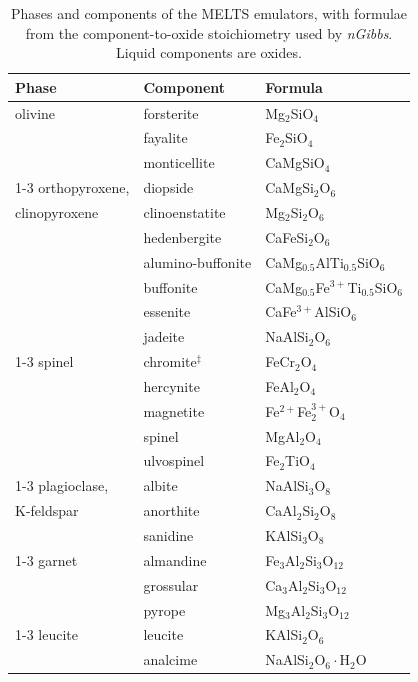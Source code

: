 \begin{landscape}
\begin{table}[p]
\centering
\scriptsize
\setlength{\tabcolsep}{4pt}
\setlength{\aboverulesep}{0.2ex}
\setlength{\belowrulesep}{0.3ex}
\caption{Phases and components of the \textsc{MELTS} emulators, with formulae from the component-to-oxide stoichiometry used by \emph{nGibbs}. 
Liquid components are oxides.}\label{tab:ch4-components-melts}
\noindent
\begin{tabular}[t]{@{}l l l@{}}
\toprule
Phase & Component & Formula \\
\midrule
olivine & forsterite & Mg$_{2}$SiO$_{4}$ \\
 & fayalite & Fe$_{2}$SiO$_{4}$ \\
 & monticellite & CaMgSiO$_{4}$ \\
\cmidrule{1-3}
orthopyroxene, & diopside & CaMgSi$_{2}$O$_{6}$ \\
clinopyroxene & clinoenstatite & Mg$_{2}$Si$_{2}$O$_{6}$ \\
 & hedenbergite & CaFeSi$_{2}$O$_{6}$ \\
 & alumino-buffonite & CaMg$_{0.5}$AlTi$_{0.5}$SiO$_{6}$ \\
 & buffonite & CaMg$_{0.5}$Fe$^{3+}$Ti$_{0.5}$SiO$_{6}$ \\
 & essenite & CaFe$^{3+}$AlSiO$_{6}$ \\
 & jadeite & NaAlSi$_{2}$O$_{6}$ \\
\cmidrule{1-3}
spinel & chromite$^{\ddagger}$ & FeCr$_{2}$O$_{4}$ \\
 & hercynite & FeAl$_{2}$O$_{4}$ \\
 & magnetite & Fe$^{2+}$Fe$^{3+}_{2}$O$_{4}$ \\
 & spinel & MgAl$_{2}$O$_{4}$ \\
 & ulvospinel & Fe$_{2}$TiO$_{4}$ \\
\cmidrule{1-3}
plagioclase, & albite & NaAlSi$_{3}$O$_{8}$ \\
K-feldspar & anorthite & CaAl$_{2}$Si$_{2}$O$_{8}$ \\
 & sanidine & KAlSi$_{3}$O$_{8}$ \\
\cmidrule{1-3}
garnet & almandine & Fe$_{3}$Al$_{2}$Si$_{3}$O$_{12}$ \\
 & grossular & Ca$_{3}$Al$_{2}$Si$_{3}$O$_{12}$ \\
 & pyrope & Mg$_{3}$Al$_{2}$Si$_{3}$O$_{12}$ \\
\cmidrule{1-3}
leucite & leucite & KAlSi$_{2}$O$_{6}$ \\
 & analcime & NaAlSi$_{2}$O$_{6}\cdot$H$_2$O \\

\end{tabular}
\end{table}
\end{landscape}
